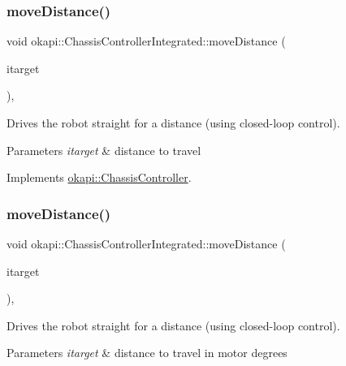 \subsubsection{\texorpdfstring{moveDistance()}{moveDistance()}\hspace{0.1cm}{\footnotesize\ttfamily [1/2]}}
{\footnotesize\ttfamily void okapi\+::\+Chassis\+Controller\+Integrated\+::move\+Distance (\begin{DoxyParamCaption}\item[{Q\+Length}]{itarget }\end{DoxyParamCaption})\hspace{0.3cm}{\ttfamily [override]}, {\ttfamily [virtual]}}

Drives the robot straight for a distance (using closed-\/loop control).


\begin{DoxyParams}{Parameters}
{\em itarget} & distance to travel \\
\hline
\end{DoxyParams}


Implements \mbox{\hyperlink{classokapi_1_1ChassisController_a6d5b69139dfa8b814d05c74c22bcaa43}{okapi\+::\+Chassis\+Controller}}.

\mbox{\label{classokapi_1_1ChassisControllerIntegrated_ab0361bc7bb5dc0b4ac4c990c1b9dd14f}} 
\subsubsection{\texorpdfstring{moveDistance()}{moveDistance()}\hspace{0.1cm}{\footnotesize\ttfamily [2/2]}}
{\footnotesize\ttfamily void okapi\+::\+Chassis\+Controller\+Integrated\+::move\+Distance (\begin{DoxyParamCaption}\item[{double}]{itarget }\end{DoxyParamCaption})\hspace{0.3cm}{\ttfamily [override]}, {\ttfamily [virtual]}}

Drives the robot straight for a distance (using closed-\/loop control).


\begin{DoxyParams}{Parameters}
{\em itarget} & distance to travel in motor degrees \\
\hline
\end{DoxyParams}


